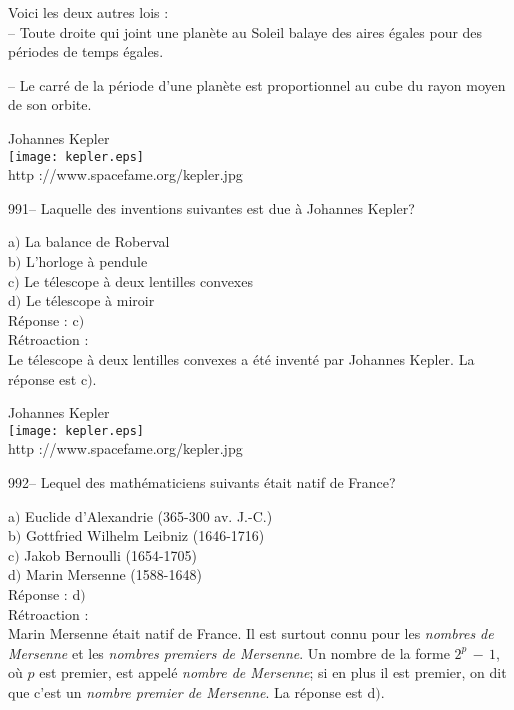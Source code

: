 ﻿\documentclass[letterpaper, 12pt]{article}
\begin{document}
Voici les deux autres lois :\\
-- Toute droite qui joint une plan\`ete au Soleil balaye des aires \'egales
pour des p\'eriodes de temps \'egales.

-- Le carr\'e de la p\'eriode d'une plan\`ete est proportionnel au
cube du rayon moyen de son orbite.
\\

        \begin{center}
        Johannes Kepler\\
    \texttt{[image: kepler.eps]}\\
        {\footnotesize http ://www.spacefame.org/kepler.jpg}
    \end{center}

991-- Laquelle des inventions suivantes est due \`a Johannes Kepler?

a$)$ La balance de Roberval \\
b$)$ L'horloge \`a pendule \\
c$)$ Le t\'elescope \`a deux lentilles convexes \\
d$)$ Le t\'elescope \`a miroir\\

R\'eponse : c$)$\\

R\'etroaction : \\
Le t\'elescope \`a deux lentilles convexes a \'et\'e invent\'e par
Johannes Kepler.
La r\'eponse est c$)$.\\

        \begin{center}
        Johannes Kepler\\
    \texttt{[image: kepler.eps]}\\
        {\footnotesize http ://www.spacefame.org/kepler.jpg}
    \end{center}

992-- Lequel des math\'ematiciens suivants \'etait natif de France?

a$)$ Euclide d'Alexandrie (365-300 av. J.-C.) \\
b$)$ Gottfried Wilhelm Leibniz (1646-1716) \\
c$)$ Jakob Bernoulli (1654-1705) \\
d$)$ Marin Mersenne (1588-1648)\\

R\'eponse : d$)$\\

R\'etroaction : \\
Marin Mersenne \'etait natif de France. Il est surtout connu pour
les {\sl nombres de Mersenne} et les {\sl nombres premiers de
Mersenne}. Un nombre de la forme $2^p\,-\,1$, o\`u $p$ est premier,
est appel\'e {\sl nombre de Mersenne}; si en plus il est premier, on
dit que c'est un {\sl nombre premier de Mersenne}.
La r\'eponse est d$)$.\\
\end{document}
